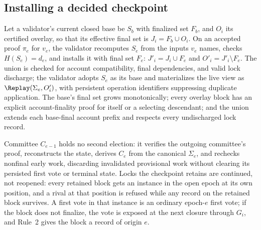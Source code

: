 \subsection{Installing a decided checkpoint}
\label{sec:install}
Let a validator's current closed base be $S_b$ with finalized set $F_b$, and $O_i$ its certified overlay, so that its effective final set is $J_i=F_b\cup O_i$. On an accepted proof $\pi_e$ for $v_e$, the validator recomputes $S_e$ from the inputs $v_e$ names, checks $H(S_e)=d_e$, and installs it with final set $F_e$: $J'_i=J_i\cup F_e$ and $O'_i=J'_i\setminus F_e$. The union is checked for account compatibility, final dependencies, and valid lock discharge; the validator adopts $S_e$ as its base and materializes the live view as $\Replay(\Sigma_e,O'_i)$, with persistent operation identifiers suppressing duplicate application. The base's final set grows monotonically; every overlay block has an explicit account-finality proof for itself or a selecting descendant; and the union extends each base-final account prefix and respects every undischarged lock record.

Committee $C_{e-1}$ holds no second election: it verifies the outgoing committee's proof, reconstructs the state, derives $C_e$ from the canonical $\Sigma_e$, and rechecks nonfinal early work, discarding invalidated provisional work without clearing its persisted first vote or terminal state. Locks the checkpoint retains are continued, not reopened: every retained block gets an instance in the open epoch at its own position, and a rival at that position is refused while any record on the retained block survives. A first vote in that instance is an ordinary epoch-$e$ first vote; if the block does not finalize, the vote is exposed at the next closure through $G_i$, and Rule~2 gives the block a record of origin $e$.

